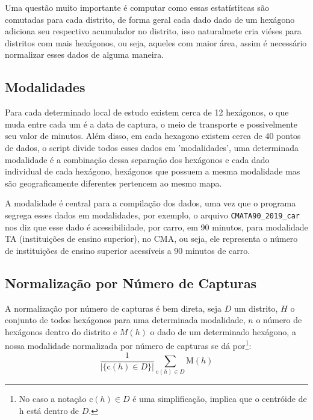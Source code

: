 \documentclass{article}
\begin{document}
\par
Uma questão muito importante é computar como essas estatístitcas são comutadas para cada distrito,
de forma geral cada dado dado de um hexágono adiciona seu respectivo acumulador no distrito, isso
naturalmete cria viéses para distritos com mais hexágonos, ou seja, aqueles com maior área, assim é
necessário normalizar esses dados de alguma maneira.

\subsection{Modalidades}
\par
Para cada determinado local de estudo existem cerca de 12 hexágonos, o que muda entre cada um é a
data de captura, o meio de transporte e possivelmente seu valor de minutos. Além disso, em cada hexagono
existem cerca de 40 pontos de dados, o script divide todos esses dados em 'modalidades', uma determinada
modalidade é a combinação dessa separação dos hexágonos e cada dado individual de cada hexágono, hexágonos que 
possuem a mesma modalidade mas são geograficamente diferentes pertencem ao mesmo mapa.

\par
A modalidade é central para a compilação dos dados, uma vez que o programa segrega esses dados em modalidades,
por exemplo, o arquivo  \verb|CMATA90_2019_car| nos diz que esse dado é acessibilidade, por carro, em 90 minutos,
para modalidade TA (instituições de ensino superior), no CMA, ou seja, ele representa o número de instituições
de ensino superior acessíveis a 90 minutos de carro.

\subsection{Normalização por Número de Capturas}
\par
A normalização por número de capturas é bem direta, seja $D$ um distrito, $H$ o conjunto de todos 
hexágonos para uma determinada modalidade, $n$ o número de hexágonos dentro do distrito e $M(h)$ o dado
de um determinado hexágono, a nossa modalidade normalizada por número de capturas se dá por\footnote{
	No caso a notação $\text{c}(h) \in D$ é uma simplificação, implica que o centróide de h está dentro de $D$.
}:
 {\large{\[
\frac 1 {|\{\text{c}(h) \in D\}|}\sum_{ \text{c}(h) \in D} \text{M}(h)
\]}}
\end{document}
